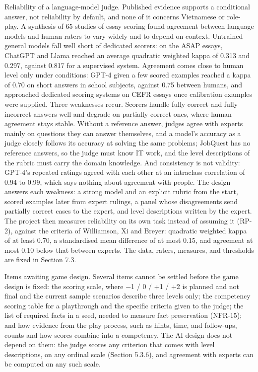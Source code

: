 Reliability of a language-\allowbreak{}model judge. Published evidence supports a conditional answer, not reliability by default, and none of it concerns Vietnamese or role-play. A synthesis of 65 studies of essay scoring found agreement between language models and human raters to vary widely and to depend on context\cite{r101}. Untrained general models fall well short of dedicated scorers: on the ASAP essays, ChatGPT and Llama reached an average quadratic weighted kappa of 0.313 and 0.297, against 0.817 for a supervised system\cite{r125}. Agreement comes close to human level only under conditions: GPT-4 given a few scored examples reached a kappa of 0.70 on short answers in school subjects, against 0.75 between humans\cite{r102}, and approached dedicated scoring systems on CEFR essays once calibration examples were supplied\cite{r103}. Three weaknesses recur. Scorers handle fully correct and fully incorrect answers well and degrade on partially correct ones, where human agreement stays stable\cite{r126}. Without a reference answer, judges agree with experts mainly on questions they can answer themselves\cite{r127}, and a model's accuracy as a judge closely follows its accuracy at solving the same problems\cite{r60}; JobQuest has no reference answers, so the judge must know IT work, and the level descriptions of the rubric must carry the domain knowledge. And consistency is not validity: GPT-4's repeated ratings agreed with each other at an intraclass correlation of 0.94 to 0.99\cite{r105}, which says nothing about agreement with people. The design answers each weakness: a strong model and an explicit rubric from the start, scored examples later from expert rulings, a panel whose disagreements send partially correct cases to the expert, and level descriptions written by the expert. The project then measures reliability on its own task instead of assuming it (RP-2), against the criteria of Williamson, Xi and Breyer\cite{r71}: quadratic weighted kappa of at least 0.70, a standardised mean difference of at most 0.15, and agreement at most 0.10 below that between experts. The data, raters, measures, and thresholds are fixed in Section 7.3.

Items awaiting game design. Several items cannot be settled before the game design is fixed: the scoring scale, where $-$1 / 0 / +1 / +2 is planned and not final and the current sample scenarios describe three levels only; the competency scoring table for a playthrough and the specific criteria given to the judge; the list of required facts in a seed, needed to measure fact preservation (NFR-15); and how evidence from the play process, such as hints, time, and follow-ups, counts and how scores combine into a competency. The AI design does not depend on them: the judge scores any criterion that comes with level descriptions, on any ordinal scale (Section 5.3.6), and agreement with experts can be computed on any such scale.

